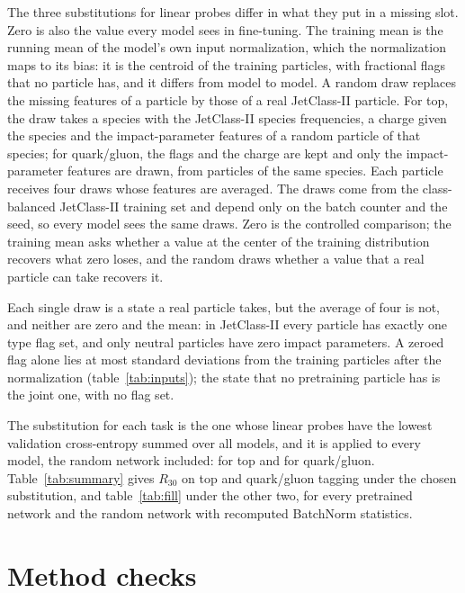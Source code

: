 The three substitutions for linear probes differ in what they put in a missing slot. Zero is also the value
every model sees in fine-tuning. The training mean is the running mean of the model's own input normalization,
which the normalization maps to its bias: it is the centroid of the training particles, with fractional
flags that no particle has, and it differs from model to model. A random draw replaces the missing
features of a particle by those of a real JetClass-II particle. For top, the draw takes a species with the
JetClass-II species frequencies, a charge given the species and the impact-parameter features of a random
particle of that species; for quark/gluon, the flags and the charge are kept and only the impact-parameter
features are drawn, from particles of the same species. Each particle receives four draws whose features
are averaged. The draws come from the class-balanced JetClass-II training set and depend only on the
batch counter and the seed, so every model sees the same draws. Zero is the controlled comparison; the training
mean asks whether a value at the center of the training distribution recovers what zero loses, and the random
draws whether a value that a real particle can take recovers it.

Each single draw is a state a real particle takes, but the average of four is not, and neither are zero
and the mean: in JetClass-II every particle has exactly one type flag set, and only neutral particles have
zero impact parameters. A zeroed flag alone lies at most \MlstInputBnZeroSigmaMax{} standard deviations
from the training particles after the normalization (table~\ref{tab:inputs}); the state that no
pretraining particle has is the joint one, with no flag set.

The substitution for each task is the one whose linear probes have the lowest validation cross-entropy summed
over all models, and it is applied to every model, the random network included:
\LpSubstitutionTop{} for top and \LpSubstitutionQg{} for quark/gluon. Table~\ref{tab:summary} gives $R_{30}$ on
top and quark/gluon tagging under the chosen substitution, and table~\ref{tab:fill} under the other two, for
every pretrained network and the random network with recomputed BatchNorm statistics.


\section{Method checks}\label{sec:app-checks}\label{sec:app-mlp}\label{sec:app-partrepro}

